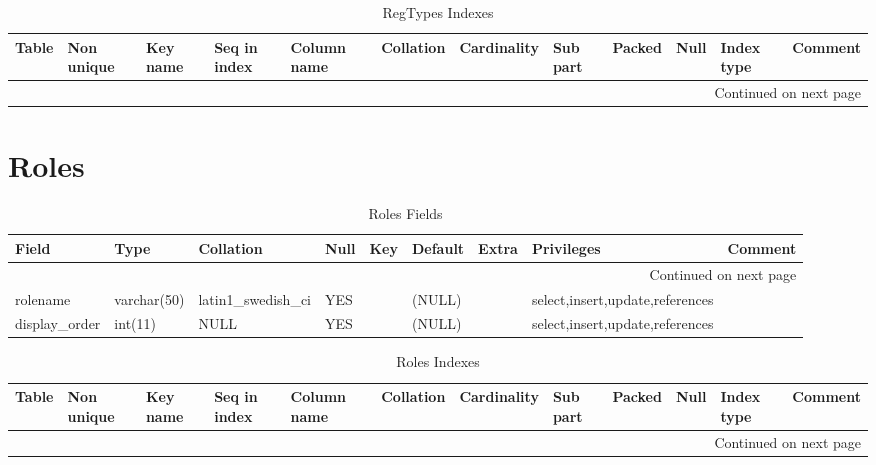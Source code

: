 \documentclass[tablesignature,landscape]{scrartcl}
\begin{document}
\begin{longtable}{|l|l|l|l|l|l|l|l|l|l|l|l|}
\caption{RegTypes Indexes} \label{tbl:regtypesindexes}\\
\hline
 Table     &  Non unique  &  Key name  &  Seq in index  &  Column name  &  Collation  &  Cardinality  &  Sub part  &  Packed  &  Null  &  Index type  &  Comment \\
\hline
\endhead
\hline\multicolumn{12}{r}{Continued on next page}\
\endfoot
\endlastfoot
\hline
 RegTypes  &           0  &  PRIMARY   &             1  &  regtype      &  A          &            9  &  (NULL)    &  (NULL)  &        &  BTREE       &           \\
\hline
\end{longtable}
\section{Roles}
\label{sec-20}


\begin{longtable}{|l|l|l|l|l|l|l|l|l|}
\caption{Roles Fields} \label{tbl:rolesfields}\\
\hline
 Field             &  Type         &  Collation                &  Null  &  Key  &  Default  &  Extra              &  Privileges                       &  Comment \\
\hline
\endhead
\hline\multicolumn{9}{r}{Continued on next page}\
\endfoot
\endlastfoot
\hline
 roleid            &  int(11)      &  NULL                     &        &  PRI  &  (NULL)   &  auto\_{}increment  &  select,insert,update,references  &           \\
 rolename          &  varchar(50)  &  latin1\_{}swedish\_{}ci  &  YES   &       &  (NULL)   &                     &  select,insert,update,references  &           \\
 display\_{}order  &  int(11)      &  NULL                     &  YES   &       &  (NULL)   &                     &  select,insert,update,references  &           \\
\hline
\end{longtable}


\begin{longtable}{|l|l|l|l|l|l|l|l|l|l|l|l|}
\caption{Roles Indexes} \label{tbl:rolesindexes}\\
\hline
 Table  &  Non unique  &  Key name  &  Seq in index  &  Column name  &  Collation  &  Cardinality  &  Sub part  &  Packed  &  Null  &  Index type  &  Comment \\
\hline
\endhead
\hline\multicolumn{12}{r}{Continued on next page}\
\endfoot
\endlastfoot
\hline
 Roles  &           0  &  PRIMARY   &             1  &  roleid       &  A          &           12  &  (NULL)    &  (NULL)  &        &  BTREE       &           \\
\hline
\end{longtable}
\end{document}
